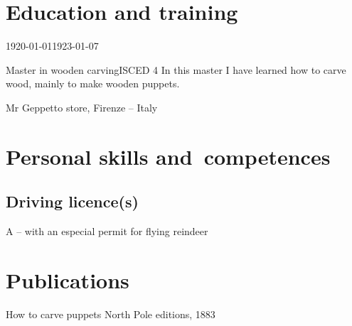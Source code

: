\documentclass[a4paper]{epasscv} %
\begin{document}
\section{Education and training}

\begin{timespan}{1920-01-01}{1923-01-07}
  \begin{education}{Master in wooden carving}{ISCED 4}
    In this master I have learned how to carve wood, mainly to make
    wooden puppets.
  \end{education}
  
  \begin{institute}
    Mr Geppetto store, Firenze -- Italy
  \end{institute}
\end{timespan}

\section{Personal skills and~competences}

\cvmothertongue{\cvEN}
\begin{cvotherlanguages}
\end{cvotherlanguages}


\subsection{Driving licence(s)}
A -- with an especial permit for flying reindeer

\section{Publications}

  {How to carve puppets}
  {North Pole editions, 1883}


\cvclosing
\end{document}
